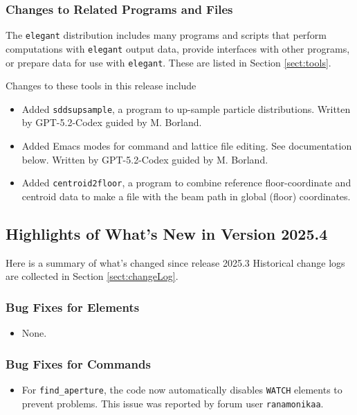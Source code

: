 \documentclass[11pt]{article}
\begin{document}
\subsubsection{Changes to Related Programs and Files}

The {\tt elegant} distribution includes many programs and scripts that perform computations with {\tt elegant}
output data, provide interfaces with other programs, or prepare data for use with {\tt elegant}. These
are listed in Section \ref{sect:tools}. 

Changes to these tools in this release include
\begin{itemize}
\item Added \verb|sddsupsample|, a program to up-sample particle distributions. Written by GPT-5.2-Codex guided by M. Borland.
\item Added Emacs modes for command and lattice file editing. See documentation below. Written by GPT-5.2-Codex guided by M. Borland.
\item Added \verb|centroid2floor|, a program to combine reference floor-coordinate and centroid data to make a file
  with the beam path in global (floor) coordinates.
\end{itemize}

\subsection{Highlights of What's New in Version 2025.4}

Here is a summary of what's changed since release 2025.3  Historical change logs are collected in Section
\ref{sect:changeLog}.

\subsubsection{Bug Fixes for Elements}

\begin{itemize}
\item None.
\end{itemize}

\subsubsection{Bug Fixes for Commands}
\begin{itemize}
\item For \verb|find_aperture|, the code now automatically disables \verb|WATCH| elements to prevent problems.
  This issue was reported by forum user \verb|ranamonikaa|.
\end{itemize}
\end{document}
